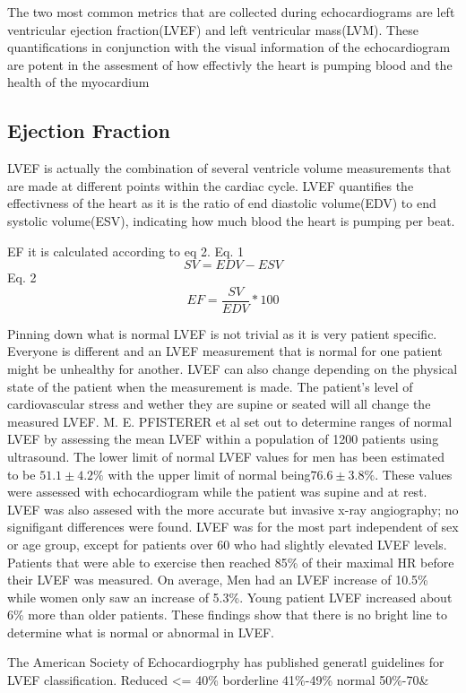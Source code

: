 \documentclass[12pt]{article}
\begin{document}
The two most common metrics that are collected during echocardiograms are left ventricular ejection fraction(LVEF) and left ventricular mass(LVM).\cite{ase_chamber_quant_update}
These quantifications in conjunction with the visual information of the echocardiogram are potent in the assesment of how effectivly the heart is pumping blood and the health of the myocardium

\subsection{Ejection Fraction}
LVEF is actually the combination of several ventricle volume measurements that are made at different points within the cardiac cycle.
LVEF quantifies the effectivness of the heart as it is the ratio of end diastolic volume(EDV) to end systolic volume(ESV), indicating how much blood the heart is pumping per beat.

EF it is calculated according to eq 2.
Eq. 1
\[SV = EDV - ESV\]
Eq. 2
\[EF = \frac{SV}{EDV} * 100   \]  

Pinning down what is normal LVEF is not trivial as it is very patient specific.
Everyone is different and an LVEF measurement that is normal for one patient might be unhealthy for another.
LVEF can also change depending on the physical state of the patient when the measurement is made.
The patient's level of cardiovascular stress and wether they are supine or seated will all change the measured LVEF.
M. E. PFISTERER et al set out to determine ranges of normal LVEF by assessing the mean LVEF within a population of 1200 patients using ultrasound.
The lower limit of normal LVEF values for men has been estimated to be $ 51.1 \pm 4.2\%$ with the upper limit of normal being$ 76.6 \pm 3.8\%$.
These values were assessed with echocardiogram while the patient was supine and at rest.
LVEF was also assesed with the more accurate but invasive x-ray angiography; no signifigant differences were found.
LVEF was for the most part independent of sex or age group, except for patients over 60 who had slightly elevated LVEF levels.
Patients that were able to exercise then reached 85\% of their maximal HR before their LVEF was measured.
On average, Men had an LVEF increase of 10.5\% while women only saw an increase of 5.3\%.
Young patient LVEF increased about 6\% more than older patients\cite{norm_EF_values}.
These findings show that there is no bright line to determine what is normal or abnormal in LVEF.

The American Society of Echocardiogrphy has published generatl guidelines for LVEF classification.
Reduced <= 40\%
borderline 41\%-49\%
normal 50\%-70\&
\end{document}
